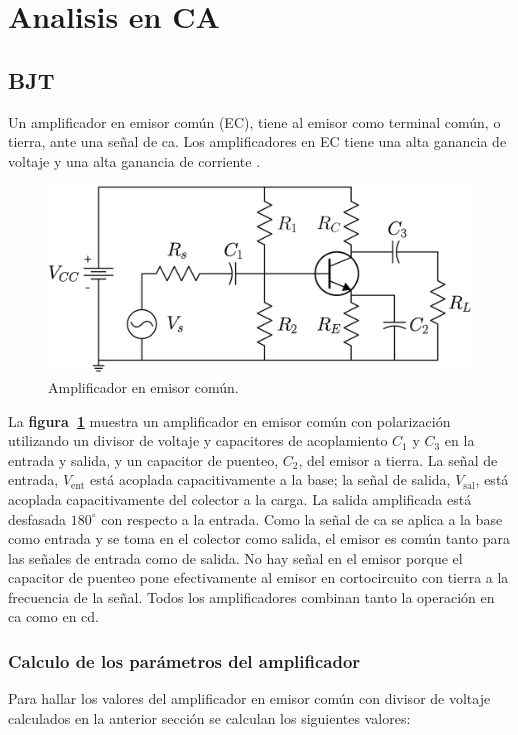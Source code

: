 \section{Analisis en CA}

\subsection{BJT}
Un amplificador en emisor común (EC), tiene al emisor como terminal común, o
tierra, ante una señal de ca. Los amplificadores en EC tiene una alta ganancia de
voltaje y una alta ganancia de corriente \cite{Floyd}.

\begin{figure}[!ht]
\centering
\includegraphics[scale=0.30]{diagramas/figura17.eps}
\caption{Amplificador en emisor común.}
\label{figura17}
\end{figure}

La \textbf{figura~\ref{figura17}} muestra un amplificador en emisor común con
polarización utilizando un divisor de voltaje y capacitores de acoplamiento
$C_1$ y $C_3$ en la entrada y salida, y un capacitor de puenteo, $C_2$, del
emisor a tierra. La señal de entrada, $V_{\text{ent}}$ está acoplada
capacitivamente a la base; la señal de salida, $V_{\text{sal}}$, está acoplada
capacitivamente del colector a la carga. La salida amplificada está desfasada
$180^{\circ}$ con respecto a la entrada. Como la señal de ca se aplica a la base
como entrada y se toma en el colector como salida, el emisor es común tanto para
las señales de entrada como de salida. No hay señal en el emisor porque el
capacitor de puenteo pone efectivamente al emisor en cortocircuito con tierra a
la frecuencia de la señal. Todos los amplificadores combinan tanto la operación
en ca como en cd.

\subsubsection{Calculo de los parámetros del amplificador}
Para hallar los valores del amplificador en emisor común con divisor de voltaje
calculados en la anterior sección se calculan los siguientes valores:

